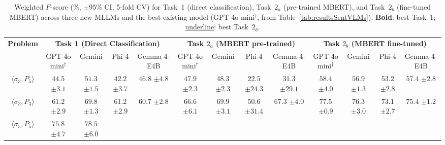 \begin{table}[!htb]
\begin{adjustwidth}{-2.25in}{0in}
\footnotesize
\caption{%
  Weighted $F$-score (\%, $\pm$95\% CI, 5-fold CV) for Task~1 (direct classification),
  Task~$2_a$ (pre-trained MBERT), and Task~$2_b$ (fine-tuned MBERT) across three new
  MLLMs and the best existing model (GPT-4o mini$^\dagger$, from Table~\ref{tab:resultsSentVLMs}).
  \textbf{Bold}: best Task~1; \underline{underline}: best Task~$2_b$.%
}
\setlength{\tabcolsep}{5pt}
\renewcommand{\arraystretch}{1.25}
\centering

\begin{tabular}{c|cccc|cccc|cccc}
\hline
\multirow{2}{*}{\textbf{Problem}}
  & \multicolumn{4}{c|}{\textbf{Task 1 (Direct Classification)}}
  & \multicolumn{4}{c|}{\textbf{Task $2_a$ (MBERT pre-trained)}}
  & \multicolumn{4}{c}{\textbf{Task $2_b$ (MBERT fine-tuned)}}
\\
\cline{2-13}
  & \multicolumn{1}{c}{GPT-4o mini$^\dagger$}
  & \multicolumn{1}{c}{Gemini}
  & \multicolumn{1}{c}{Phi-4}
  & \multicolumn{1}{c|}{Gemma-4-E4B}
  & \multicolumn{1}{c}{GPT-4o mini$^\dagger$}
  & \multicolumn{1}{c}{Gemini}
  & \multicolumn{1}{c}{Phi-4}
  & \multicolumn{1}{c|}{Gemma-4-E4B}
  & \multicolumn{1}{c}{GPT-4o mini$^\dagger$}
  & \multicolumn{1}{c}{Gemini}
  & \multicolumn{1}{c}{Phi-4}
  & \multicolumn{1}{c}{Gemma-4-E4B}
\\
\hline
$\langle\sigma_3,P_5\rangle$
  & $44.5$ \scriptsize $\pm 3.1$
  & $\mathbf{51.3}$ \scriptsize $\pm 1.5$
  & $42.2$ \scriptsize $\pm 3.7$
  & $46.8$ \scriptsize $\pm 4.8$
  & $47.9$ \scriptsize $\pm 2.3$
  & $48.3$ \scriptsize $\pm 2.3$
  & $22.5$ \scriptsize $\pm 24.3$
  & $31.3$ \scriptsize $\pm 29.1$
  & \underline{$58.4$} \scriptsize $\pm 4.0$
  & $56.9$ \scriptsize $\pm 1.3$
  & $53.2$ \scriptsize $\pm 2.8$
  & $57.4$ \scriptsize $\pm 2.8$
\\\hline
$\langle\sigma_3,P_3\rangle$
  & $61.2$ \scriptsize $\pm 2.9$
  & $\mathbf{69.8}$ \scriptsize $\pm 1.3$
  & $61.2$ \scriptsize $\pm 2.9$
  & $60.7$ \scriptsize $\pm 2.8$
  & $66.6$ \scriptsize $\pm 6.1$
  & $69.9$ \scriptsize $\pm 3.1$
  & $50.6$ \scriptsize $\pm 31.4$
  & $67.3$ \scriptsize $\pm 4.0$
  & \underline{$77.5$} \scriptsize $\pm 0.9$
  & $76.3$ \scriptsize $\pm 3.0$
  & $73.1$ \scriptsize $\pm 2.7$
  & $75.4$ \scriptsize $\pm 1.2$
\\\hline
$\langle\sigma_5,P_5\rangle$
  & $75.8$ \scriptsize $\pm 4.7$
  & $\mathbf{78.5}$ \scriptsize $\pm 6.0$

\end{tabular}
\end{adjustwidth}
\end{table}
